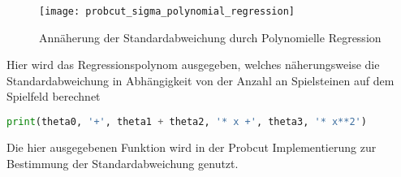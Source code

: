 \begin{figure}[H]
    \centering
    \texttt{[image: probcut\_sigma\_polynomial\_regression]}
    \caption{Annäherung der Standardabweichung durch Polynomielle Regression}
    \label{fig:probcut_sigma_polynomial_regression}
\end{figure}

Hier wird das Regressionspolynom ausgegeben, welches näherungsweise die
Standardabweichung in Abhängigkeit von der Anzahl an Spielsteinen auf
dem Spielfeld berechnet

\begin{lstlisting}[language=Python]
print(theta0, '+', theta1 + theta2, '* x +', theta3, '* x**2')
\end{lstlisting}

Die hier ausgegebenen Funktion wird in der Probcut Implementierung zur
Bestimmung der Standardabweichung genutzt.
